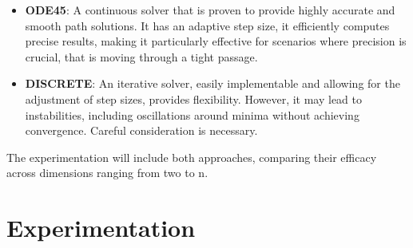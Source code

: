 \documentclass{IEEEtaes}
\newcommand{\algrule}[1][.1pt]{\par\vskip.2\baselineskip\hrule height #1\par\vskip.5\baselineskip}
\begin{document}
{\begin{itemize}
    \item \textbf{ODE45}: A continuous solver that is proven to provide highly accurate and smooth path solutions. It has an adaptive step size, it efficiently computes precise results, making it particularly effective for scenarios where precision is crucial, that is moving through a tight passage. 
    \item \textbf{DISCRETE}: An iterative solver, easily implementable and allowing for the adjustment of step sizes, provides flexibility. However, it may lead to instabilities, including oscillations around minima without achieving convergence. Careful consideration is necessary.
\end{itemize}

The experimentation will include both approaches, comparing their efficacy across dimensions ranging from two to n.




\section{\large \textbf{Experimentation}}
}
\end{document}
